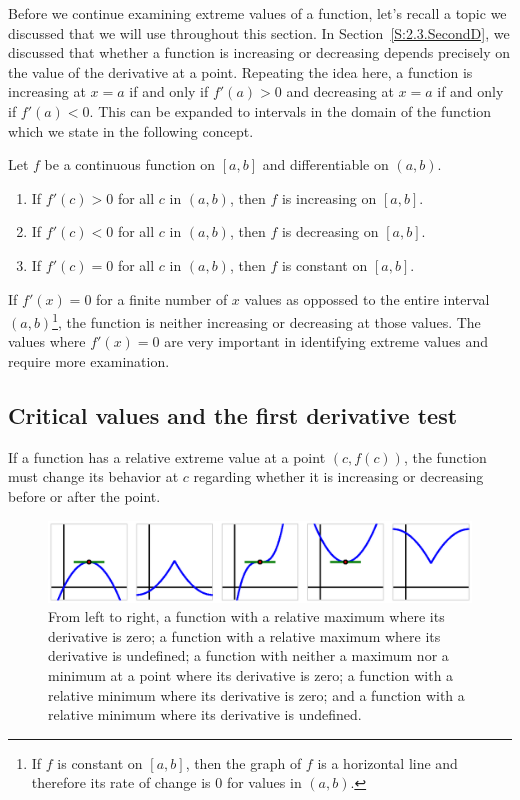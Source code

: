 Before we continue examining extreme values of a function, let's recall a topic we discussed that we will use throughout this section.
In Section~\ref{S:2.3.SecondD}, we discussed that whether a function is increasing or decreasing depends precisely on the value of the derivative at a point. Repeating the idea here, a function is increasing at $x=a$ if and only if $f'(a)>0$ and decreasing at $x=a$ if and only if $f'(a)<0$. This can be expanded to intervals in the domain of the function which we state in the following concept.

{Let $f$ be a continuous function on $[a,b]$ and differentiable on $(a,b)$.
\begin{enumerate}
\item If $f'(c) > 0$ for all $c$ in $(a,b)$, then $f$ is increasing on $[a,b]$.
\item If $f'(c) <0$ for all $c$ in $(a,b)$, then $f$ is decreasing on $[a,b]$.
\item If $f'(c) =0$ for all $c$ in $(a,b)$, then $f$ is constant on $[a,b]$.
\end{enumerate}
} %

If $f'(x)=0$ for a finite number of $x$ values as oppossed to the entire interval $(a,b)$\footnote{If $f$ is constant on $[a,b]$, then the graph of $f$ is a horizontal line and therefore its rate of change is $0$ for values in $(a,b)$.}, the function is neither increasing or decreasing at those values.  The values where $f'(x)= 0$ are very important in identifying extreme values and require more examination.

\subsection*{Critical values and the first derivative test}
 
If a function has a relative extreme value at a point $(c,f(c))$, the function must change its behavior at $c$ regarding whether it is increasing or decreasing before or after the point.

\begin{figure} %
\includegraphics{figures/3_1_extremes.eps}
\caption{From left to right, a function with a relative maximum where its derivative is zero; a function with a relative maximum where its derivative is undefined; a function with neither a maximum nor a minimum at a point where its derivative is zero; a function with a relative minimum where its derivative is zero; and a function with a relative minimum where its derivative is undefined.} \label{fig:3.2.extremes}
\end{figure} 

